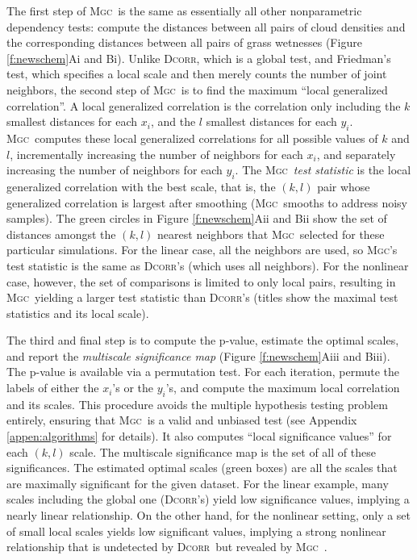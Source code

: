 \documentclass[11pt]{article}
\providecommand{\sct}[1]{{\normalfont\textsc{#1}}}
\newcommand{\Mgc}{\sct{Mgc}}
\newcommand{\Dcorr}{\sct{Dcorr}}
\begin{document}
The first step of \Mgc~is the same as essentially all other nonparametric dependency tests:
compute the distances between all pairs of cloud densities and the corresponding distances between all pairs of grass wetnesses (Figure \ref{f:newschem}{\color{magenta}Ai} and {\color{magenta}Bi}).
Unlike \Dcorr, which is a global test, and Friedman's test, which specifies a local scale and then merely counts the number of joint neighbors,  the second step of \Mgc~is to find the maximum ``local generalized correlation''.
A local generalized correlation is the correlation only including the $k$ smallest distances for each $x_i$, and the $l$ smallest distances for each  $y_i$.  \Mgc~computes these local generalized correlations for all possible values of $k$ and $l$, incrementally increasing the number of neighbors for each $x_i$, and separately increasing the number of neighbors for each $y_i$.
The \Mgc~\emph{test statistic} is the local generalized correlation with the best scale, that is, the $(k,l)$ pair whose generalized correlation is largest after smoothing (\Mgc~smooths to address noisy samples). 
The green circles in Figure \ref{f:newschem}{\color{magenta}Aii} and {\color{magenta}Bii} show the set of distances amongst the $(k,l)$ nearest neighbors that \Mgc~selected for these particular simulations.
For the linear case, all the neighbors are used, so  \Mgc's test statistic is the same as \Dcorr's (which uses all neighbors).  For the nonlinear case, however, the set of comparisons is limited to only local pairs, resulting in \Mgc~yielding a larger test statistic  than \Dcorr's (titles show the maximal test statistics and its local scale).   

The third and final step is to compute the p-value, estimate the optimal scales, and report the  \emph{multiscale significance map} (Figure \ref{f:newschem}{\color{magenta}Aiii} and {\color{magenta}Biii}). 
The p-value is available via a permutation test.  For each iteration, permute the labels of either the $x_i$'s or the $y_i$'s, and compute the maximum local correlation and its scales.  This procedure avoids the multiple hypothesis testing problem entirely, ensuring that \Mgc~is a valid and unbiased test (see Appendix \ref{appen:algorithms} for details).  It also computes ``local significance values''  for each $(k,l)$ scale.  The multiscale significance map is the set of all of these significances.   
The estimated optimal scales (green boxes) are all the scales that are maximally significant for the given dataset.
For the linear example, many scales including the global one (\Dcorr's) yield low significance values, implying a nearly linear relationship.
On the other hand, for the nonlinear setting, only a set of small local scales yields low significant values, implying a strong nonlinear relationship that is undetected by \Dcorr~but revealed by \Mgc~.
% 
% 
\end{document}

